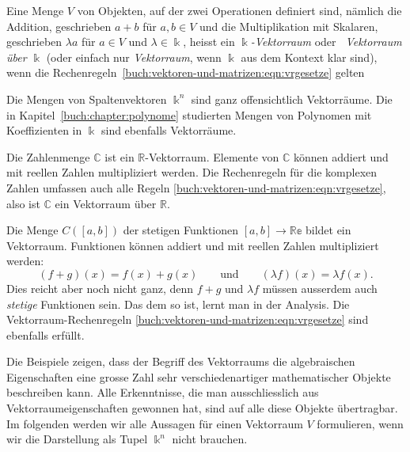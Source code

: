 \begin{definition}
Eine Menge $V$ von Objekten, auf der zwei Operationen definiert sind,
nämlich die Addition, geschrieben $a+b$ für $a,b\in V$ und die
Multiplikation mit Skalaren, geschrieben $\lambda a$ für $a\in V$ und
$\lambda\in \Bbbk$, heisst ein {\em $\Bbbk$-Vektorraum} oder {\em Vektorraum
über $\Bbbk$} (oder
einfach nur {\em Vektorraum}, wenn $\Bbbk$ aus dem Kontext klar sind),
wenn die Rechenregeln~\eqref{buch:vektoren-und-matrizen:eqn:vrgesetze}
gelten
%
%
\end{definition}

Die Mengen von Spaltenvektoren $\Bbbk^n$ sind ganz offensichtlich
Vektorräume.
Die in Kapitel~\ref{buch:chapter:polynome} studierten Mengen von
Polynomen mit Koeffizienten in $\Bbbk$ sind ebenfalls Vektorräume.

\begin{beispiel}
Die Zahlenmenge $\mathbb{C}$ ist ein $\mathbb{R}$-Vektorraum.
%
Elemente von $\mathbb{C}$ können addiert und mit reellen Zahlen
multipliziert werden.
Die Rechenregeln für die komplexen Zahlen umfassen auch alle Regeln
\eqref{buch:vektoren-und-matrizen:eqn:vrgesetze}, also ist
$\mathbb{C}$ ein Vektorraum über $\mathbb{R}$.
\end{beispiel}

\begin{beispiel}
Die Menge $C([a,b])$ der stetigen Funktionen $[a,b]\to\mathbb{Re}$
bildet ein Vektorraum.
%
Funktionen können addiert und mit reellen Zahlen multipliziert werden:
\[
(f+g)(x) = f(x) + g(x)
\qquad\text{und}\qquad
(\lambda f)(x) = \lambda f(x).
\]
Dies reicht aber noch nicht ganz, denn $f+g$ und $\lambda f$ müssen
ausserdem auch {\em stetige} Funktionen sein.
Das dem so ist, lernt man in der Analysis.
Die Vektorraum-Rechenregeln
\eqref{buch:vektoren-und-matrizen:eqn:vrgesetze} sind ebenfalls erfüllt.
\end{beispiel}

Die Beispiele zeigen, dass der Begriff des Vektorraums die algebraischen
Eigenschaften eine grosse Zahl sehr verschiedenartiger mathematischer
Objekte beschreiben kann.
Alle Erkenntnisse, die man ausschliesslich aus Vektorraumeigenschaften
gewonnen hat, sind auf alle diese Objekte übertragbar.
Im folgenden werden wir alle Aussagen für einen Vektorraum $V$ formulieren,
wenn wir die Darstellung als Tupel $\Bbbk^n$ nicht brauchen.

